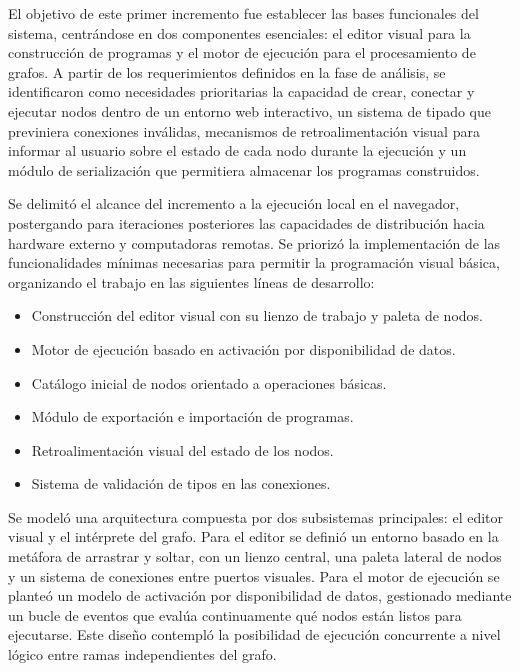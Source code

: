 
El objetivo de este primer incremento fue establecer las bases funcionales del sistema, centrándose en dos componentes esenciales: el editor visual para la construcción de programas y el motor de ejecución para el procesamiento de grafos. A partir de los requerimientos definidos en la fase de análisis, se identificaron como necesidades prioritarias la capacidad de crear, conectar y ejecutar nodos dentro de un entorno web interactivo, un sistema de tipado que previniera conexiones inválidas, mecanismos de retroalimentación visual para informar al usuario sobre el estado de cada nodo durante la ejecución y un módulo de serialización que permitiera almacenar los programas construidos.

Se delimitó el alcance del incremento a la ejecución local en el navegador, postergando para iteraciones posteriores las capacidades de distribución hacia hardware externo y computadoras remotas. Se priorizó la implementación de las funcionalidades mínimas necesarias para permitir la programación visual básica, organizando el trabajo en las siguientes líneas de desarrollo:

\begin{itemize}
    \item Construcción del editor visual con su lienzo de trabajo y paleta de nodos.
    \item Motor de ejecución basado en activación por disponibilidad de datos.
    \item Catálogo inicial de nodos orientado a operaciones básicas.
    \item Módulo de exportación e importación de programas.
    \item Retroalimentación visual del estado de los nodos.
    \item Sistema de validación de tipos en las conexiones.
\end{itemize}

Se modeló una arquitectura compuesta por dos subsistemas principales: el editor visual y el intérprete del grafo. Para el editor se definió un entorno basado en la metáfora de arrastrar y soltar, con un lienzo central, una paleta lateral de nodos y un sistema de conexiones entre puertos visuales. Para el motor de ejecución se planteó un modelo de activación por disponibilidad de datos, gestionado mediante un bucle de eventos que evalúa continuamente qué nodos están listos para
ejecutarse. Este diseño contempló la posibilidad de ejecución concurrente a nivel lógico entre ramas independientes del grafo.

